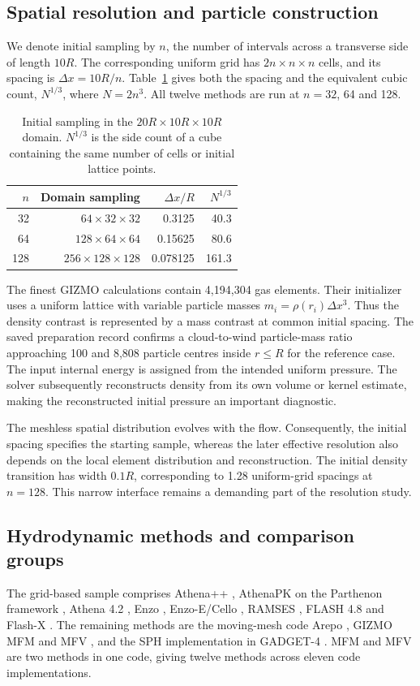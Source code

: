 \documentclass[twocolumn,apj,numberedappendix]{openjournal}
\begin{document}
\subsection{Spatial resolution and particle construction}
We denote initial sampling by $n$, the number of intervals across a transverse side of length $10R$. The corresponding uniform grid has $2n\times n\times n$ cells, and its spacing is $\Delta x=10R/n$. Table~\ref{tab:resolution} gives both the spacing and the equivalent cubic count, $N^{1/3}$, where $N=2n^3$. All twelve methods are run at $n=32$, 64 and 128.
\begin{table}[tb]
\centering
\caption{Initial sampling in the $20R\times10R\times10R$ domain. $N^{1/3}$ is the side count of a cube containing the same number of cells or initial lattice points.}
\label{tab:resolution}
\begin{tabular}{rrrr}
\toprule
$n$ & Domain sampling & $\Delta x/R$ & $N^{1/3}$\\
\midrule
32 & $64\times32\times32$ & 0.3125 & 40.3\\
64 & $128\times64\times64$ & 0.15625 & 80.6\\
128 & $256\times128\times128$ & 0.078125 & 161.3\\
\bottomrule
\end{tabular}
\end{table}

The finest GIZMO calculations contain 4,194,304 gas elements. Their initializer uses a uniform lattice with variable particle masses $m_i=\rho(r_i)\Delta x^3$. Thus the density contrast is represented by a mass contrast at common initial spacing. The saved preparation record confirms a cloud-to-wind particle-mass ratio approaching 100 and 8,808 particle centres inside $r\leq R$ for the reference case. The input internal energy is assigned from the intended uniform pressure. The solver subsequently reconstructs density from its own volume or kernel estimate, making the reconstructed initial pressure an important diagnostic.

The meshless spatial distribution evolves with the flow. Consequently, the initial spacing specifies the starting sample, whereas the later effective resolution also depends on the local element distribution and reconstruction. The initial density transition has width $0.1R$, corresponding to 1.28 uniform-grid spacings at $n=128$. This narrow interface remains a demanding part of the resolution study.

\subsection{Hydrodynamic methods and comparison groups}
The grid-based sample comprises Athena++ \citep{Stone2020}, AthenaPK on the Parthenon framework \citep{Grete2022}, Athena 4.2 \citep{Stone2008}, Enzo \citep{Bryan2014}, Enzo-E/Cello \citep{Bordner2018}, RAMSES \citep{Teyssier2002}, FLASH 4.8 \citep{Fryxell2000} and Flash-X \citep{Dubey2022}. The remaining methods are the moving-mesh code Arepo \citep{Springel2010}, GIZMO MFM and MFV \citep{Hopkins2015}, and the SPH implementation in GADGET-4 \citep{Springel2021}. MFM and MFV are two methods in one code, giving twelve methods across eleven code implementations.
\end{document}
